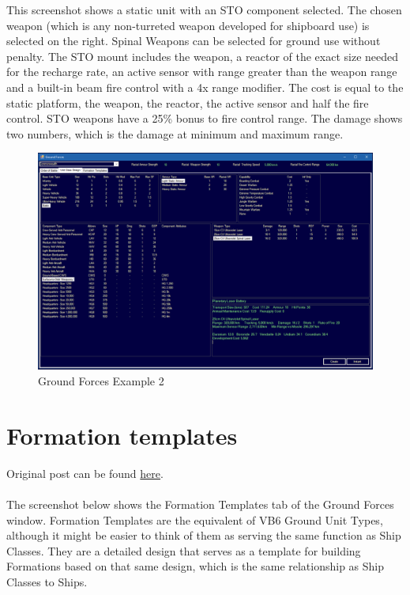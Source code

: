 \documentclass[../Aurora C# unofficial manual.tex]{subfiles}
\begin{document}
	This screenshot shows a static unit with an STO component selected. The chosen weapon (which is any non-turreted weapon developed for shipboard use) is selected on the right. Spinal Weapons can be selected for ground use without penalty. The STO mount includes the weapon, a reactor of the exact size needed for the recharge rate, an active sensor with range greater than the weapon range and a built-in beam fire control with a 4x range modifier. The cost is equal to the static platform, the weapon, the reactor, the active sensor and half the fire control. STO weapons have a 25\% bonus to fire control range. The damage shows two numbers, which is the damage at minimum and maximum range.
	\begin{figure}[H]
		\centering
		\includegraphics[width=0.9\linewidth]{images/GroundForces2}
		\caption[Ground Forces 2]{Ground Forces Example 2}
		\label{fig:groundforces2}
	\end{figure}

	
	\section{Formation templates}
	Original post can be found
	\href{http://aurora2.pentarch.org/index.php?topic=8495.msg105832#msg105832}{here}.
	\\\\
	
	The screenshot below shows the Formation Templates tab of the Ground Forces window. Formation Templates are the equivalent of VB6 Ground Unit Types, although it might be easier to think of them as serving the same function as Ship Classes. They are a detailed design that serves as a template for building Formations based on that same design, which is the same relationship as Ship Classes to Ships.
	
\end{document}
